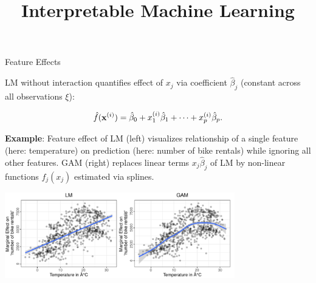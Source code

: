 \documentclass[11pt,compress,t,notes=noshow, aspectratio=169, xcolor=table]{beamer}
\title{Interpretable Machine Learning}
\date{}
\begin{document}
\newcommand{\titlefigure}{figure/feature-effect}
\newcommand{\learninggoals}{
\item Introduction to feature effects
\item Understand the steps involved in constructing ICE plots
}


\begin{frame}{Feature Effects}

LM without interaction quantifies effect of $x_j$ via coefficient $\hat\beta_j$ (constant across all observations $\xi$):

$$\fh(\xi) = \hat\beta_0 + x^{(i)}_1\hat\beta_1 + \dots + x^{(i)}_p\hat\beta_p.$$




\textbf{Example}: %
Feature effect of LM (left) visualizes relationship of a single feature (here: temperature) on prediction (here: number of bike rentals) while ignoring all other features.
GAM (right) replaces linear terms $x_j\hat\beta_j$ of LM by non-linear functions $f_j(x_j)$ estimated via splines.

\centering
\includegraphics[width=0.75\textwidth, trim=0cm 0.1cm 0cm 0cm, clip]{figure/lm_main_effects}

\end{frame}
\end{document}
